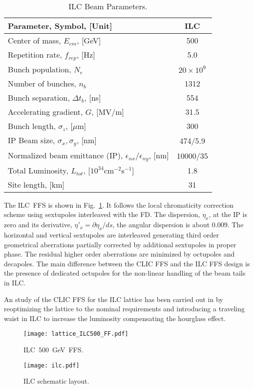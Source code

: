 \begin{table}[h]
 \centering
 \begin{tabular}{l||c}\hline
 Parameter, Symbol, [Unit] & ILC \\\hline\hline
 Center of mass, $E_{cm}$, [GeV] & 500\\
 Repetition rate, $f_{rep}$, [Hz] & 5.0\\
 Bunch population, $N_e$  & $20\times10^9$\\
 Number of bunches, $n_b$ & 1312 \\
 Bunch separation, $\Delta t_b$, [ns] & 554\\
 Accelerating gradient, $G$, [MV/m] & 31.5\\
 Bunch length, 	$\sigma_z$, [$\mu$m] & 300\\
 IP Beam size, $\sigma_x,\sigma_y$, [nm] & 474/5.9\\
 Normalized beam emittance (IP), $\epsilon_{nx}/\epsilon_{ny}$, [nm] & 10000/35\\
 Total Luminosity, $L_{tot}$, [$10^{34}$cm$^{-2}$s$^{-1}$] & 1.8\\
 Site length, [km] & 31\\\hline
 \end{tabular}\caption{ILC Beam Parameters.}\label{t:ILCparam}
\end{table}
The ILC~FFS is shown in Fig.~\ref{f:ILCFFS}. It follows the local chromaticity correction scheme using sextupoles interleaved with the FD. The dispersion, $\eta_x$, at the IP is zero and its derivative, $\eta'_x=\partial \eta_x /ds$, the angular dispersion is about 0.009. The horizontal and vertical sextupoles are interleaved generating third order geometrical aberrations partially corrected by additional sextupoles in proper phase. The residual higher order aberrations are minimized by octupoles and decapoles. The main difference between the CLIC FFS and the ILC FFS design is the presence of dedicated octupoles for the non-linear handling of the beam tails in ILC.\par
An study of the CLIC FFS for the ILC lattice has been carried out in \cite{GarciaMorales:1982827} by reoptimizing the lattice to the nominal requirements and introducing a traveling waist \cite{Balakin} in ILC to increase the luminosity compensating the hourglass effect.
\begin{figure}[h]
\centering
\texttt{[image: lattice\_ILC500\_FF.pdf]}\caption{ILC~500~GeV~FFS.}\label{f:ILCFFS}
\end{figure}
\begin{figure}[h]
\centering
\texttt{[image: ilc.pdf]}\caption{ILC schematic layout.}\label{f:ILC}
\end{figure}

